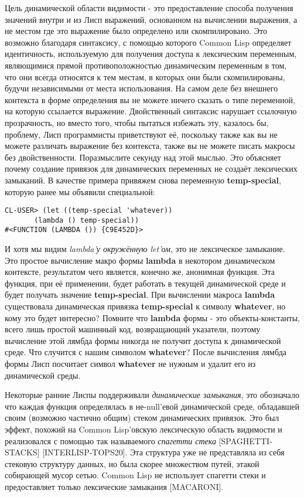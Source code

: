 Цель динамической области видимости - это предоставление способа получения значений внутри и из Лисп выражений, основанном на вычислении выражения, а не местом где это выражение было определено или скомпилировано. Это возможно благодаря синтаксису, с помощью которого Common Lisp определяет идентичность, используемую для получения доступа к лексическим переменным, являющимися прямой противоположностью динамическим переменным в том, что они всегда относятся к тем местам, в которых они были скомпилированы, будучи независимыми от места использования. На самом деле без внешнего контекста в форме определения вы не можете ничего сказать о типе переменной, на которую ссылается выражение. Двойственный синтаксис нарушает ссылочную прозрачность, но вместо того, чтобы пытаться избежать эту, казалось бы, проблему, Лисп программисты приветствуют её, поскольку также как вы не можете различать выражение без контекста, также вы не можете писать макросы без двойственности. Поразмыслите секунду над этой мыслью. Это объясняет почему создание привязок для динамических переменных не создаёт лексических замыканий. В качестве примера привяжем снова переменную \textbf{temp-special}, которую ранее мы объявили специальной:

\begin{verbatim}
CL-USER> (let ((temp-special 'whatever))
	   (lambda () temp-special))
#<FUNCTION (LAMBDA ()) {C9E452D}>
\end{verbatim}

И хотя мы видим \emph{lambda'у окружённую let'ом}, это не лексическое замыкание. Это простое вычисление макро формы \textbf{lambda} в некотором динамическом контексте, результатом чего является, конечно же, анонимная функция. Эта функция, при её применении, будет работать в текущей динамической среде и будет получать значение \textbf{temp-special}. При вычислении макроса \textbf{lambda} существовала динамическая привязка \textbf{temp-special} к символу \textbf{whatever}, но кому это будет интересно? Помните что \textbf{lambda} формы - это объекты-константы, всего лишь простой машинный код, возвращающий указатели, поэтому вычисление этой лямбда формы никогда не получит доступа к динамической среде. Что случится с нашим символом \textbf{whatever}? После вычисления лямбда формы Лисп посчитает символ \textbf{whatever} не нужным и удалит его из динамической среды.

Некоторые ранние Лиспы поддерживали \emph{динамические замыкания}, это обозначало что каждая функция определялась в не-null'евой динамической среде, обладавшей своим (возможно частично общим) стеком динамических привязок. Это был эффект, похожий на Common Lisp'овскую лексическую область видимости и реализовался с помощью так называемого \emph{спагетти стека} [SPAGHETTI-STACKS] [INTERLISP-TOPS20]. Эта структура уже не представляла из себя стековую структуру данных, но была скорее множеством путей, этакой собирающей мусор сетью. Common Lisp не использует спагетти стеки и предоставляет только лексические замыкания [MACARONI].

